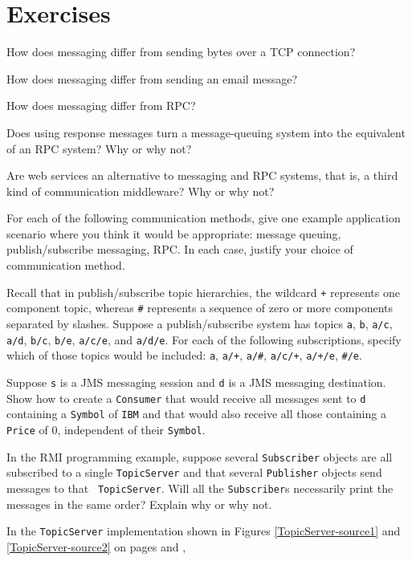 \section*{Exercises}
\begin{chapterEnumerate}
\item
How does messaging differ from sending bytes over a TCP connection?
\item
How does messaging differ from sending an email message?
\item
How does messaging differ from RPC?
\item
Does using response messages turn a message-queuing system into the
equivalent of an RPC system?  Why or why not?
\item
Are web services an alternative to messaging and RPC systems, that is,
a third kind of communication middleware?  Why or why not?
\item
For each of the following communication methods, give one example
application scenario where you think it would be appropriate: message
queuing, publish/subscribe messaging, RPC.  In each case, justify your
choice of communication method.
\item
Recall that in publish/subscribe topic hierarchies, the wildcard
\verb|+| represents one component topic, whereas \verb|#| represents a
sequence of zero or more components separated by slashes.
Suppose a publish/subscribe system has topics \verb|a|, \verb|b|,
\verb|a/c|, \verb|a/d|, \verb|b/c|, \verb|b/e|,
\verb|a/c/e|, and \verb|a/d/e|.  For each of the
following subscriptions, specify which of those topics would be
included: \verb|a|, \verb|a/+|, \verb|a/#|, \verb|a/c/+|, \verb|a/+/e|, \verb|#/e|.
\item
Suppose \verb|s| is a JMS messaging session and \verb|d| is a JMS
messaging destination.  Show how to create a \verb|Consumer| that
would receive all
messages sent to \verb|d| containing a \verb|Symbol| of \verb|IBM| and that
would also receive all those containing a \verb|Price| of 0,
independent of their \verb|Symbol|.
\item
In the RMI programming example, suppose several {\tt Subscriber}
objects are all subscribed to a single {\tt TopicServer} and that
several {\tt Publisher} objects send messages to that {\tt
  TopicServer}.  Will all the {\tt Subscriber}s necessarily print the
messages in the same order?  Explain why or why not.
\item\label{BoundedBuffer-TopicServer-exercise}
In the {\tt TopicServer} implementation shown in
Figures \ref{TopicServer-source1} and \ref{TopicServer-source2} on pages \pageref{TopicServer-source1} and \pageref{TopicServer-source2},

\end{chapterEnumerate}
